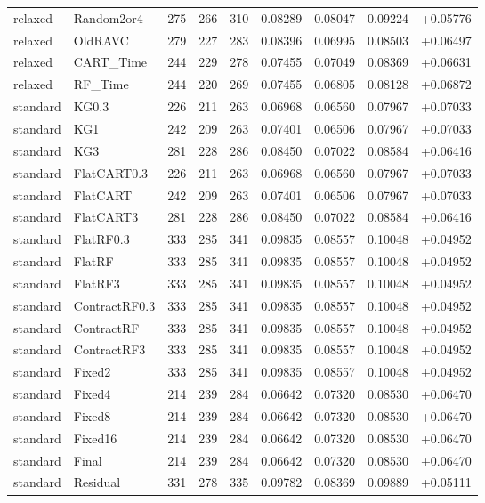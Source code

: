 \begin{longtable}{@{}llrrrrrrr@{}}
relaxed & Random2or4 & 275 & 266 & 310 & 0.08289 & 0.08047 & 0.09224 & +0.05776\\
relaxed & OldRAVC & 279 & 227 & 283 & 0.08396 & 0.06995 & 0.08503 & +0.06497\\
relaxed & CART\_Time & 244 & 229 & 278 & 0.07455 & 0.07049 & 0.08369 & +0.06631\\
relaxed & RF\_Time & 244 & 220 & 269 & 0.07455 & 0.06805 & 0.08128 & +0.06872\\
standard & KG0.3 & 226 & 211 & 263 & 0.06968 & 0.06560 & 0.07967 & +0.07033\\
standard & KG1 & 242 & 209 & 263 & 0.07401 & 0.06506 & 0.07967 & +0.07033\\
standard & KG3 & 281 & 228 & 286 & 0.08450 & 0.07022 & 0.08584 & +0.06416\\
standard & FlatCART0.3 & 226 & 211 & 263 & 0.06968 & 0.06560 & 0.07967 & +0.07033\\
standard & FlatCART & 242 & 209 & 263 & 0.07401 & 0.06506 & 0.07967 & +0.07033\\
standard & FlatCART3 & 281 & 228 & 286 & 0.08450 & 0.07022 & 0.08584 & +0.06416\\
standard & FlatRF0.3 & 333 & 285 & 341 & 0.09835 & 0.08557 & 0.10048 & +0.04952\\
standard & FlatRF & 333 & 285 & 341 & 0.09835 & 0.08557 & 0.10048 & +0.04952\\
standard & FlatRF3 & 333 & 285 & 341 & 0.09835 & 0.08557 & 0.10048 & +0.04952\\
standard & ContractRF0.3 & 333 & 285 & 341 & 0.09835 & 0.08557 & 0.10048 & +0.04952\\
standard & ContractRF & 333 & 285 & 341 & 0.09835 & 0.08557 & 0.10048 & +0.04952\\
standard & ContractRF3 & 333 & 285 & 341 & 0.09835 & 0.08557 & 0.10048 & +0.04952\\
standard & Fixed2 & 333 & 285 & 341 & 0.09835 & 0.08557 & 0.10048 & +0.04952\\
standard & Fixed4 & 214 & 239 & 284 & 0.06642 & 0.07320 & 0.08530 & +0.06470\\
standard & Fixed8 & 214 & 239 & 284 & 0.06642 & 0.07320 & 0.08530 & +0.06470\\
standard & Fixed16 & 214 & 239 & 284 & 0.06642 & 0.07320 & 0.08530 & +0.06470\\
standard & Final & 214 & 239 & 284 & 0.06642 & 0.07320 & 0.08530 & +0.06470\\
standard & Residual & 331 & 278 & 335 & 0.09782 & 0.08369 & 0.09889 & +0.05111\\

\end{longtable}
